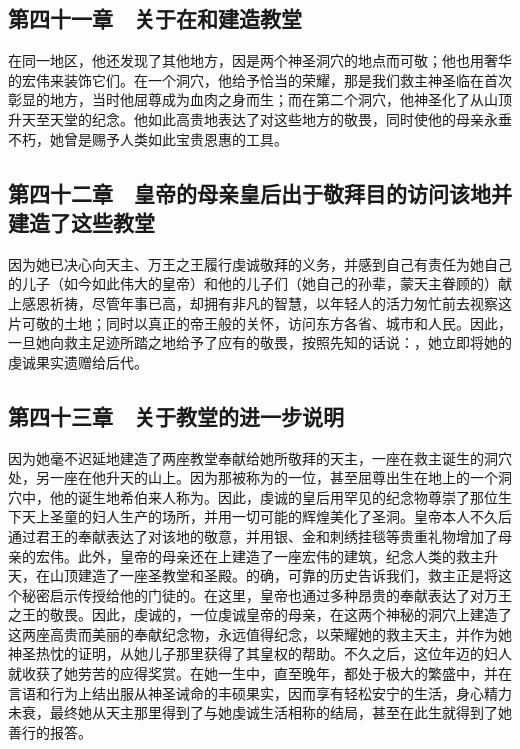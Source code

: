 
\subsection{第四十一章　关于在和建造教堂}

在同一地区，他还发现了其他地方，因是两个神圣洞穴的地点而可敬；他也用奢华的宏伟来装饰它们。在一个洞穴，他给予恰当的荣耀，那是我们救主神圣临在首次彰显的地方，当时他屈尊成为血肉之身而生；而在第二个洞穴，他神圣化了从山顶升天至天堂的纪念。他如此高贵地表达了对这些地方的敬畏，同时使他的母亲永垂不朽，她曾是赐予人类如此宝贵恩惠的工具。\par


\subsection{第四十二章　皇帝的母亲皇后出于敬拜目的访问该地并建造了这些教堂}

因为她已决心向天主、万王之王履行虔诚敬拜的义务，并感到自己有责任为她自己的儿子（如今如此伟大的皇帝）和他的儿子们（她自己的孙辈，蒙天主眷顾的）献上感恩祈祷，尽管年事已高，却拥有非凡的智慧，以年轻人的活力匆忙前去视察这片可敬的土地；同时以真正的帝王般的关怀，访问东方各省、城市和人民。因此，一旦她向救主足迹所踏之地给予了应有的敬畏，按照先知的话说：，她立即将她的虔诚果实遗赠给后代。\par


\subsection{第四十三章　关于教堂的进一步说明}

因为她毫不迟延地建造了两座教堂奉献给她所敬拜的天主，一座在救主诞生的洞穴处，另一座在他升天的山上。因为那被称为的一位，甚至屈尊出生在地上的一个洞穴中，他的诞生地希伯来人称为。因此，虔诚的皇后用罕见的纪念物尊崇了那位生下天上圣童的妇人生产的场所，并用一切可能的辉煌美化了圣洞。皇帝本人不久后通过君王的奉献表达了对该地的敬意，并用银、金和刺绣挂毯等贵重礼物增加了母亲的宏伟。此外，皇帝的母亲还在上建造了一座宏伟的建筑，纪念人类的救主升天，在山顶建造了一座圣教堂和圣殿。的确，可靠的历史告诉我们，救主正是将这个秘密启示传授给他的门徒的。在这里，皇帝也通过多种昂贵的奉献表达了对万王之王的敬畏。因此，虔诚的，一位虔诚皇帝的母亲，在这两个神秘的洞穴上建造了这两座高贵而美丽的奉献纪念物，永远值得纪念，以荣耀她的救主天主，并作为她神圣热忱的证明，从她儿子那里获得了其皇权的帮助。不久之后，这位年迈的妇人就收获了她劳苦的应得奖赏。在她一生中，直至晚年，都处于极大的繁盛中，并在言语和行为上结出服从神圣诫命的丰硕果实，因而享有轻松安宁的生活，身心精力未衰，最终她从天主那里得到了与她虔诚生活相称的结局，甚至在此生就得到了她善行的报答。\par

